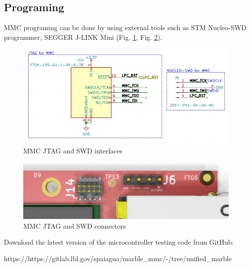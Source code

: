 \documentclass[12pt,oneside,a4]{article}
\begin{document}
\subsection{Programing}
MMC programing can be done by using external tools such as STM Nucleo-SWD programmer, SEGGER J-LINK Mini (Fig. \ref{mmcjtag}, Fig. \ref{mmcjtagswd}).

\begin{figure}[H]
\begin{center}
\includegraphics[width=1\linewidth]{mmcjtag.png}
 \caption{MMC JTAG and SWD interfaces}\label{mmcjtag}
\end{center}
\end{figure}

\begin{figure}[H]
\begin{center}
\includegraphics[width=1\linewidth]{mmcjtagswd.png}
 \caption{MMC JTAG and SWD connectors}\label{mmcjtagswd}
\end{center}
\end{figure}

Download the latest version of the microcontroller testing code from GitHub:
\begin{leftbar}
https://https://gitlab.lbl.gov/spaiagua/marble\_mmc/-/tree/unified\_marble
\end{leftbar}
\end{document}
